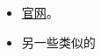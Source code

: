 
\begin{issues}
\issueDraft
\end{issues}

\begin{itemize}
\item \href{https://bup.github.io/}{官网}。
\item 另一些类似的
\end{itemize}
